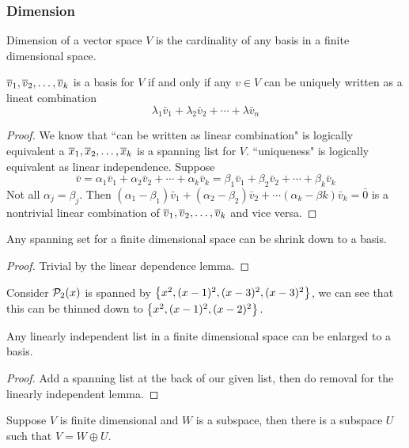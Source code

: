\subsubsection{Dimension}
\begin{definition}
    Dimension of a vector space $V$ is the cardinality of any basis in a finite dimensional space.
\end{definition}
\begin{proposition}
    ${\overline v}_1,{\overline v}_2, \ldots, {\overline v}_{k}$ is a basis for $V$ if and only if any $v \in V$ can be uniquely written as a lineat combination
    \[ \lambda_1 \bar v_1 + \lambda_2 \bar v_2 + \cdots + \lambda \bar v_n \]
\end{proposition}
\begin{proof}
    We know that ``can be written  as linear combination" is logically equivalent a ${\overline x}_1,{\overline x}_2, \ldots, {\overline x}_{k}$ is a spanning list for $V$. ``uniqueness" is logically equivalent as linear independence. Suppose
    \[ \bar v = \alpha_1 \bar v_1 + \alpha_2 \bar v_2 + \cdots + \alpha_k \bar v_k = \beta_1 \bar v_1 + \beta_2 \bar v_2 + \cdots + \beta_k \bar v_k\]
    Not all $\alpha_j = \beta_j$. Then $(\alpha_1 -\beta_1) \bar v_1 + (\alpha_2 - \beta_2) \bar v_2 + \cdots (\alpha_k - \beta k) \bar v_k = \bar 0$ is a nontrivial linear combination of ${\overline v}_1,{\overline v}_2, \ldots, {\overline v}_{k}$ and vice versa. 
\end{proof}
\begin{theorem}
    Any spanning set for a finite dimensional space can be shrink down to a basis.
\end{theorem}
\begin{proof}
    Trivial by the linear dependence lemma.
\end{proof}
\begin{example}
    Consider $\mathcal P_2(x)$ is spanned by $\left\{ x^2, (x-1)^2, (x-3)^2, (x-3)^2\right\}$, we can see that this can be thinned down to $\left\{ x^2, (x-1)^2, (x-2)^2 \right\}$.
\end{example}
\begin{corollary}
    Any linearly independent list in a finite dimensional space can be enlarged to a basis.
\end{corollary}
\begin{proof}
    Add a spanning list at the back of our given list, then do removal for the linearly independent lemma.
\end{proof}
\begin{theorem}
    Suppose $V$ is finite dimensional and $W$ is a subspace, then there is a subspace $U$ such that $V = W \oplus U$.
\end{theorem}
